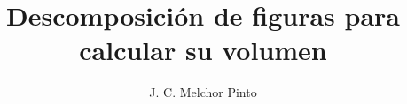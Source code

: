 \documentclass[12pt,addpoints,answers]{guia}
\title{Descomposición de figuras para calcular su volumen}
\author{J. C. Melchor Pinto}
\begin{document}
\pagestyle{headandfoot}

\INFO
\printanswers
\begin{multicols}{2}
    
    
    
\end{multicols}
\begin{questions}
    \questionboxed[10]{}
    \questionboxed[10]{}
    \questionboxed[10]{}
    \questionboxed[10]{}
    \questionboxed[10]{}
    \questionboxed[10]{}
    \questionboxed[10]{}
    \questionboxed[10]{}
    \questionboxed[10]{}
    \questionboxed[10]{}
\end{questions}
\end{document}
